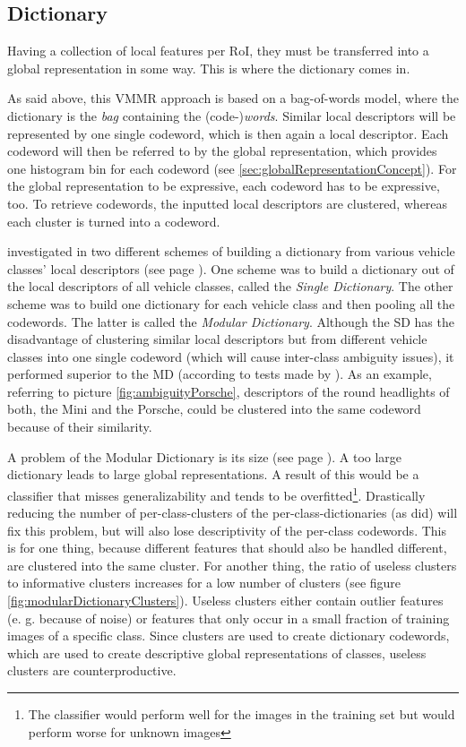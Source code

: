 \subsection{Dictionary}\label{sec:dictionaryConcept}
Having a collection of local features per RoI, they must be transferred into a global representation in some way. This is where the dictionary comes in.

As said above, this VMMR approach is based on a bag-of-words model, where the dictionary is the \emph{bag} containing the (code-)\emph{words}. Similar local descriptors will be represented by one single codeword, which is then again a local descriptor. Each codeword will then be referred to by the global representation, which provides one histogram bin for each codeword (see \ref{sec:globalRepresentationConcept}). For the global representation to be expressive, each codeword has to be expressive, too. To retrieve codewords, the inputted local descriptors are clustered, whereas each cluster is turned into a codeword.

\citeauthor{siddiqui2015robust} \citep{siddiqui2015robust} investigated in two different schemes of building a dictionary from various vehicle classes' local descriptors (see page \pageref{par:dictionaryGenerationStateOfTheArt}). One scheme was to build a dictionary out of the local descriptors of all vehicle classes, called the \emph{Single Dictionary}. The other scheme was to build one dictionary for each vehicle class and then pooling all the codewords. The latter is called the \emph{Modular Dictionary}. Although the SD has the disadvantage of clustering similar local descriptors but from different vehicle classes into one single codeword (which will cause inter-class ambiguity issues), it performed superior to the MD (according to tests made by \citeauthor{siddiqui2015robust}). As an example, referring to picture \ref{fig:ambiguityPorsche}, descriptors of the round headlights of both, the Mini and the Porsche, could be clustered into the same codeword because of their similarity.

A problem of the Modular Dictionary is its size (see page \pageref{par:dictionaryGenerationStateOfTheArt}). A too large dictionary leads to large global representations. A result of this would be a classifier that misses generalizability and tends to be overfitted\footnote{The classifier would perform well for the images in the training set but would perform worse for unknown images}. Drastically reducing the number of per-class-clusters of the per-class-dictionaries (as \citeauthor{siddiqui2015robust} did) will fix this problem, but will also lose descriptivity of the per-class codewords. This is for one thing, because different features that should also be handled different, are clustered into the same cluster. For another thing, the ratio of useless clusters to informative clusters increases for a low number of clusters (see figure \ref{fig:modularDictionaryClusters}). Useless clusters either contain outlier features (e. g. because of noise) or features that only occur in a small fraction of training images of a specific class. Since clusters are used to create dictionary codewords, which are used to create descriptive global representations of classes, useless clusters are counterproductive.

